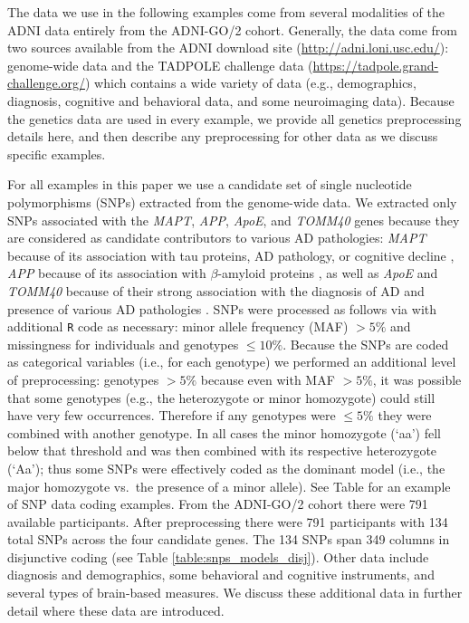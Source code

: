\documentclass[12pt]{article}
\begin{document}
The data we use in the following examples come from several modalities
of the ADNI data entirely from the ADNI-GO/2 cohort. Generally, the data
come from two sources available from the ADNI download site
(\url{http://adni.loni.usc.edu/}): genome-wide data and the TADPOLE
challenge data (\url{https://tadpole.grand-challenge.org/}) which
contains a wide variety of data (e.g., demographics, diagnosis,
cognitive and behavioral data, and some neuroimaging data). Because the
genetics data are used in every example, we provide all genetics
preprocessing details here, and then describe any preprocessing for
other data as we discuss specific examples.

For all examples in this paper we use a candidate set of single
nucleotide polymorphisms (SNPs) extracted from the genome-wide data. We
extracted only SNPs associated with the \textit{MAPT}, \textit{APP},
\textit{ApoE}, and \textit{TOMM40} genes because they are considered as
candidate contributors to various AD pathologies: \textit{MAPT} because
of its association with tau proteins, AD pathology, or cognitive decline
\citep{myers_h1c_2005, trabzuni_mapt_2012, desikan_genetic_2015, cruchaga_rare_2012, peterson_variants_2014},
\textit{APP} because of its association with \(\beta\)-amyloid proteins
\citep{cruchaga_rare_2012, huang_apoe2_2017, jonsson_mutation_2012}, as
well as \textit{ApoE} and \textit{TOMM40} because of their strong
association with the diagnosis of AD and presence of various AD
pathologies
\citep{linnertz_cis-regulatory_2014, roses_tomm40_2010-1, bennet_pleiotropy_2010, huang_apoe2_2017}.
SNPs were processed as follows via \citet{purcell2007plink} with
additional \texttt{R} code as necessary: minor allele frequency (MAF)
\(> 5\%\) and missingness for individuals and genotypes \(\leq 10\%\).
Because the SNPs are coded as categorical variables (i.e., for each
genotype) we performed an additional level of preprocessing: genotypes
\(> 5\%\) because even with MAF \(> 5\%\), it was possible that some
genotypes (e.g., the heterozygote or minor homozygote) could still have
very few occurrences. Therefore if any genotypes were \(\leq 5\%\) they
were combined with another genotype. In all cases the minor homozygote
(`aa') fell below that threshold and was then combined with its
respective heterozygote (`Aa'); thus some SNPs were effectively coded as
the dominant model (i.e., the major homozygote vs.~the presence of a
minor allele). See Table for an example of SNP data coding examples.
From the ADNI-GO/2 cohort there were 791 available participants. After
preprocessing there were 791 participants with 134 total SNPs across the
four candidate genes. The 134 SNPs span 349 columns in disjunctive
coding (see Table \ref{table:snps_models_disj}). Other data include
diagnosis and demographics, some behavioral and cognitive instruments,
and several types of brain-based measures. We discuss these additional
data in further detail where these data are introduced.
\end{document}
